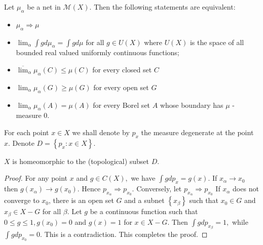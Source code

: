\begin{thm}
	Let \( \mu _ { \alpha } \) be a net in \( \mathscr { M } ( X ) . \) Then the following statements are equivalent:
	\begin{itemize}
		\label{weak_convergence_thm}
		\item \( \mu _ { \alpha } \Rightarrow \mu \)
		\item \( \lim _ { \alpha } \int g d \mu _ { \alpha } = \int g d \mu \) for all \( g \in U ( X ) \) where \( U ( X ) \) is the space of all bounded real valued uniformly continuous functions;
		\item \( \overline { \lim } _ { \alpha } \mu _ { \alpha } ( C ) \leqslant \mu ( C ) \) for every closed set \( C \)
		\item \( \lim _ { \alpha } \mu _ { \alpha } ( G ) \geqslant \mu ( G ) \) for every open set \( G \)
		\item \( \lim _ { \alpha } \mu _ { \alpha } ( A ) = \mu ( A ) \) for every Borel set \( A \) whose boundary has \( \mu \) -measure \( 0 . \)
	\end{itemize}
\end{thm}

For each point \( x \in X \) we shall denote by \( p _ { x } \) the measure degenerate at the point \( x \). Denote \( D = \left\{ p _ { x }: x \in X \right\} \).

\begin{lem}
	\label{dirac_measure_weak_homeomeorphic}
	\( X \) is homeomorphic to the (topological) subset $D$.
\end{lem}

\begin{proof}
	For any point \( x \) and \( g \in C ( X ) , \) we have \( \int g d p _ { x } = g ( x ) \). If \( x _ { \alpha } \rightarrow x _ { 0 } \) then \( g \left( x _ { \alpha } \right) \rightarrow g \left( x _ { 0 } \right) . \) Hence \( p _ { x _ { \alpha } } \Rightarrow p _ { x _ { 0 } } \). Conversely, let \( p _ { x _ { \alpha } } \Rightarrow p _ { x _ { 0 } } \) If \( x _ { \alpha } \) does not converge to \( x _ { 0 } \), there is an open set \( G \) and a subnet \( \left\{ x _ { \beta } \right\} \) such that \( x _ { 0 } \in G \) and \( x _ { \beta } \in X - G \) for all \( \beta . \) Let \( g \) be a continuous function such that \( 0 \leqslant g \leqslant 1 , g \left( x _ { 0 } \right) = 0 \) and \( g ( x ) = 1 \) for \( x \in X - G \). Then \( \int g d p _ { x _ { \beta } } = 1 , \) while \( \int g d p _ { x _ { 0 } } = 0 . \) This is a contradiction. This completes the proof.
\end{proof}

